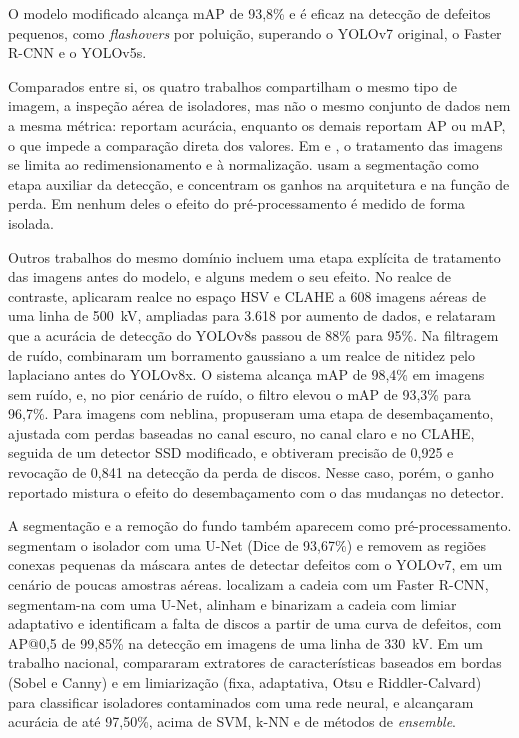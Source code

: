 O modelo modificado alcança mAP de 93,8\% e é eficaz na detecção de defeitos pequenos, como \textit{flashovers} por poluição, superando o YOLOv7 original, o Faster R-CNN e o YOLOv5s.

Comparados entre si, os quatro trabalhos compartilham o mesmo tipo de imagem, a inspeção aérea de isoladores, mas não o mesmo conjunto de dados nem a mesma métrica:  reportam acurácia, enquanto os demais reportam AP ou mAP, o que impede a comparação direta dos valores. Em  e , o tratamento das imagens se limita ao redimensionamento e à normalização.  usam a segmentação como etapa auxiliar da detecção, e  concentram os ganhos na arquitetura e na função de perda. Em nenhum deles o efeito do pré-processamento é medido de forma isolada.

Outros trabalhos do mesmo domínio incluem uma etapa explícita de tratamento das imagens antes do modelo, e alguns medem o seu efeito. No realce de contraste,  aplicaram realce no espaço HSV e CLAHE a 608 imagens aéreas de uma linha de 500~kV, ampliadas para 3.618 por aumento de dados, e relataram que a acurácia de detecção do YOLOv8s passou de 88\% para 95\%. Na filtragem de ruído,  combinaram um borramento gaussiano a um realce de nitidez pelo laplaciano antes do YOLOv8x. O sistema alcança mAP de 98,4\% em imagens sem ruído, e, no pior cenário de ruído, o filtro elevou o mAP de 93,3\% para 96,7\%. Para imagens com neblina,  propuseram uma etapa de desembaçamento, ajustada com perdas baseadas no canal escuro, no canal claro e no CLAHE, seguida de um detector SSD modificado, e obtiveram precisão de 0,925 e revocação de 0,841 na detecção da perda de discos. Nesse caso, porém, o ganho reportado mistura o efeito do desembaçamento com o das mudanças no detector.

A segmentação e a remoção do fundo também aparecem como pré-processamento.  segmentam o isolador com uma U-Net (Dice de 93,67\%) e removem as regiões conexas pequenas da máscara antes de detectar defeitos com o YOLOv7, em um cenário de poucas amostras aéreas.  localizam a cadeia com um Faster R-CNN, segmentam-na com uma U-Net, alinham e binarizam a cadeia com limiar adaptativo e identificam a falta de discos a partir de uma curva de defeitos, com AP@0,5 de 99,85\% na detecção em imagens de uma linha de 330~kV. Em um trabalho nacional,  compararam extratores de características baseados em bordas (Sobel e Canny) e em limiarização (fixa, adaptativa, Otsu e Riddler-Calvard) para classificar isoladores contaminados com uma rede neural, e alcançaram acurácia de até 97,50\%, acima de SVM, k-NN e de métodos de \textit{ensemble}.

